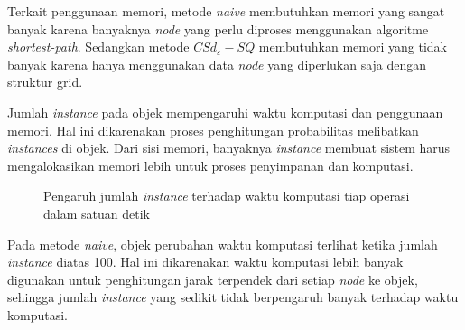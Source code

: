 \documentclass[conference]{IEEEtran}
\begin{document}
Terkait penggunaan memori, metode \textit{naive} membutuhkan memori yang sangat banyak karena banyaknya \textit{node} yang perlu diproses menggunakan algoritme \textit{shortest-path}. Sedangkan metode $ CSd_\varepsilon-SQ$ membutuhkan memori yang tidak banyak karena hanya menggunakan data \textit{node} yang diperlukan saja dengan struktur grid.

Jumlah \textit{instance} pada objek mempengaruhi waktu komputasi dan penggunaan memori. Hal ini dikarenakan proses penghitungan probabilitas melibatkan \textit{instances} di objek. Dari sisi memori, banyaknya \textit{instance} membuat sistem harus mengalokasikan memori lebih untuk proses penyimpanan dan komputasi.

\begin{figure}
	\centering
	\caption{Pengaruh jumlah \textit{instance} terhadap waktu komputasi tiap operasi dalam satuan detik}\label{fig:uji-np}
\end{figure}

Pada metode \textit{naive}, objek perubahan waktu komputasi terlihat ketika jumlah \textit{instance} diatas 100. Hal ini dikarenakan waktu komputasi lebih banyak digunakan untuk penghitungan jarak terpendek dari setiap \textit{node} ke objek, sehingga jumlah \textit{instance} yang sedikit tidak berpengaruh banyak terhadap waktu komputasi.
\end{document}
